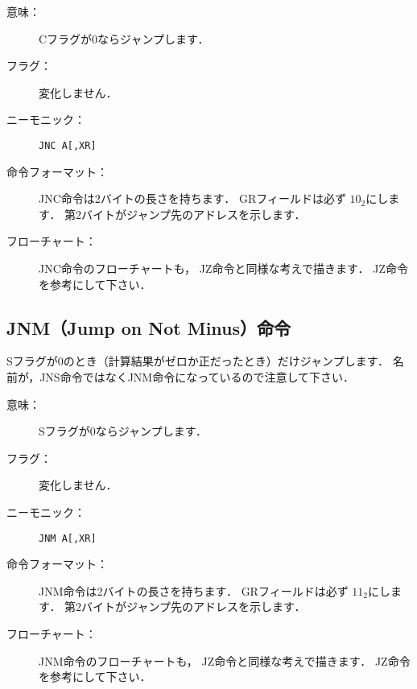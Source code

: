 \begin{description}
\item[意味：]Cフラグが0ならジャンプします．

\item[フラグ：]変化しません．

\item[ニーモニック：]{\tt JNC  A[,XR]}

\item[命令フォーマット：]JNC命令は2バイトの長さを持ちます．
GRフィールドは必ず $10_2$にします．
第2バイトがジャンプ先のアドレスを示します．


\item[フローチャート：]JNC命令のフローチャートも，
JZ命令と同様な考えで描きます．
JZ命令を参考にして下さい．

\end{description}

\subsection{JNM（Jump on Not Minus）命令}
Sフラグが0のとき（計算結果がゼロか正だったとき）だけジャンプします．
名前が，JNS命令ではなくJNM命令になっているので注意して下さい．

\begin{description}
\item[意味：]Sフラグが0ならジャンプします．

\item[フラグ：]変化しません．

\item[ニーモニック：]{\tt JNM  A[,XR]}

\item[命令フォーマット：]JNM命令は2バイトの長さを持ちます．
GRフィールドは必ず $11_2$にします．
第2バイトがジャンプ先のアドレスを示します．


\item[フローチャート：]JNM命令のフローチャートも，
JZ命令と同様な考えで描きます．
JZ命令を参考にして下さい．

\end{description}

